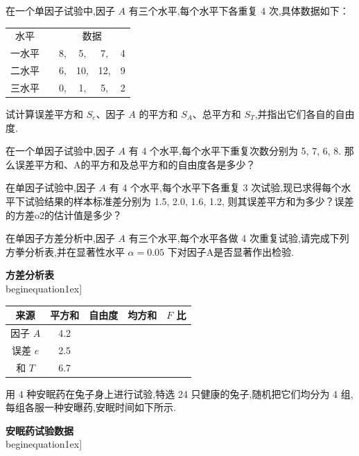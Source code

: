 \begin{xiti}
    \item 在一个单因子试验中,因子 $A$ 有三个水平,每个水平下各重复 4 次,具体数据如下：
    \begin{center}
      \begin{tabular}{cccccc}
        水平    &       & \multicolumn{4}{c}{数据} \\
        一水平   &       & 8,    & 5,    & 7,    & 4 \\
        二水平   &       & 6,    & 10,   & 12,   & 9 \\
        三水平   &       & 0,    & 1,    & 5,    & 2 \\
      \end{tabular}%
    \end{center}
    试计算误差平方和 $S_e$、因子 $A$ 的平方和 $S_A$、总平方和 $S_T$,并指出它们各自的自由度.
    \item 在一个单因子试验中,因子 $A$ 有 4 个水平,每个水平下重复次数分别为 5, 7, 6, 8. 那么误差平方和、A的平方和及总平方和的自由度各是多少？
    \item 在单因子试验中,因子 $A$ 有 4 个水平,每个水平下各重复 3 次试验,现已求得每个水平下试验结果的样本标准差分别为 1.5, 2.0, 1.6, 1.2, 则其误差平方和为多少？误差的方差o2的估计值是多少？
    \item 在单因子方差分析中,因子 $A$ 有三个水平,每个水平各做 4 次重复试验,请完成下列方拳分析表,并在显著性水平 $\alpha=0.05$ 下对因子A是否显著作出检验.
    \begin{center}
      \textbf{方差分析表}\\begin{equation}1ex]
      \begin{tabular}{ccccc}
        \toprule
        来源    & 平方和 & 自由度 &均方和 & $F$ 比 \\
        \midrule
        因子 $A$   & 4.2   &       &       &  \\
        误差 $e$  & 2.5   &       &       &  \\
        和 $T$   & 6.7   &       &       &  \\
        \bottomrule
        \end{tabular}%
    \end{center}
    \item 用 4 种安眠药在兔子身上进行试验,特选 24 只健康的兔子,随机把它们均分为 4 组,每组各服一种安曝药,安眠时间如下所示.
    \begin{center}
      \textbf{安眠药试验数据}\\begin{equation}1ex]

\end{center}
\end{xiti}
